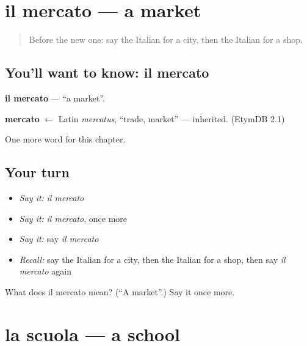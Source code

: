 \section[il mercato]{il mercato — a market}

\label{lesson:IT-C81-mercato}



\begin{quote}
Before the new one: say the Italian for a city, then the Italian for a shop.
\end{quote}

\subsection*{You'll want to know: il mercato}
\textbf{il mercato} — \textquotedblleft{}a market\textquotedblright{}.

\begin{cousinweb}
\textbf{mercato} $\leftarrow$ Latin \emph{mercatus}, \textquotedblleft{}trade, market\textquotedblright{} — inherited. (EtymDB 2.1)
\end{cousinweb}

\begin{grammarlens}[title={What you've built}]
One more word for this chapter.
\end{grammarlens}

\subsection*{Your turn}
\begin{itemize}
\raggedright
  \item \emph{Say it:} \emph{il mercato}
  \item \emph{Say it:} \emph{il mercato}, once more
  \item \emph{Say it:} say \emph{il mercato}
  \item \emph{Recall:} say the Italian for a city, then the Italian for a shop, then say \emph{il mercato} again
\end{itemize}

\begin{tcolorbox}[breakable,colback=teal!4,colframe=teal!35!black,title={Before you move on}]
What does il mercato mean? (\textquotedblleft{}A market\textquotedblright{}.) Say it once more.
\end{tcolorbox}
\section[la scuola]{la scuola — a school}

